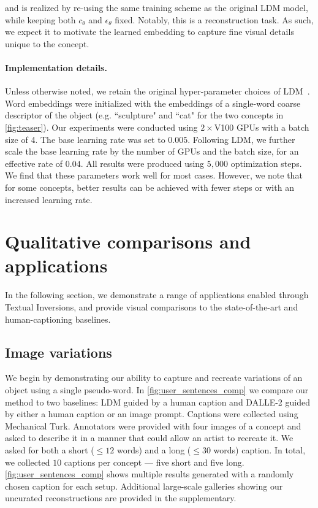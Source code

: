 and is realized by re-using the same training scheme as the original LDM model, while keeping both $c_\theta$ and $\epsilon_\theta$ fixed. Notably, this is a reconstruction task. As such, we expect it to motivate the learned embedding to capture fine visual details unique to the concept.

\paragraph{Implementation details.} Unless otherwise noted, we retain the original hyper-parameter choices of LDM~\citep{rombach2021highresolution}. Word embeddings were initialized with the embeddings of a single-word coarse descriptor of the object (e.g. ``sculpture" and ``cat" for the two concepts in \ref{fig:teaser}). Our experiments were conducted using $2\times$V100 GPUs with a batch size of 4. The base learning rate was set to $0.005$. Following LDM, we further scale the base learning rate by the number of GPUs and the batch size, for an effective rate of $0.04$. All results were produced using $5,000$ optimization steps. We find that these parameters work well for most cases. However, we note that for some concepts, better results can be achieved with fewer steps or with an increased learning rate.

\section{Qualitative comparisons and applications} 

In the following section, we demonstrate a range of applications enabled through Textual Inversions, and provide visual comparisons to the state-of-the-art and human-captioning baselines. 

\label{sec:applications}

\subsection{Image variations}
\label{sec:image_variations}

We begin by demonstrating our ability to capture and recreate variations of an object using a single pseudo-word. In \ref{fig:user_sentences_comp} we compare our method to two baselines: LDM guided by a human caption and DALLE-2 guided by either a human caption or an image prompt. Captions were collected using Mechanical Turk. Annotators were provided with four images of a concept and asked to describe it in a manner that could allow an artist to recreate it. We asked for both a short ($\leq12$ words) and a long ($\leq30$ words) caption. In total, we collected $10$ captions per concept --- five short and five long. \ref{fig:user_sentences_comp} shows multiple results generated with a randomly chosen caption for each setup. Additional large-scale galleries showing our uncurated reconstructions are provided in the supplementary.

